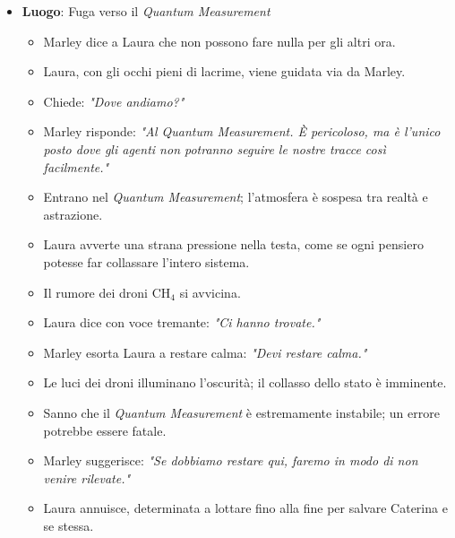 \begin{itemize}
    \item \textbf{Luogo}: Fuga verso il \emph{Quantum Measurement}
    \begin{itemize}
        \item Marley dice a Laura che non possono fare nulla per gli altri ora.
        \item Laura, con gli occhi pieni di lacrime, viene guidata via da Marley.
        \item Chiede: \emph{"Dove andiamo?"}
        \item Marley risponde: \emph{"Al Quantum Measurement. È pericoloso, ma è l'unico posto dove gli agenti non potranno seguire le nostre tracce così facilmente."}
        \item Entrano nel \emph{Quantum Measurement}; l'atmosfera è sospesa tra realtà e astrazione.
        \item Laura avverte una strana pressione nella testa, come se ogni pensiero potesse far collassare l'intero sistema.
    \end{itemize}
    
    \begin{itemize}
        \item Il rumore dei droni CH$_4$ si avvicina.
        \item Laura dice con voce tremante: \emph{"Ci hanno trovate."}
        \item Marley esorta Laura a restare calma: \emph{"Devi restare calma."}
        \item Le luci dei droni illuminano l'oscurità; il collasso dello stato è imminente.
        \item Sanno che il \emph{Quantum Measurement} è estremamente instabile; un errore potrebbe essere fatale.
        \item Marley suggerisce: \emph{"Se dobbiamo restare qui, faremo in modo di non venire rilevate."}
        \item Laura annuisce, determinata a lottare fino alla fine per salvare Caterina e se stessa.
    \end{itemize}
\end{itemize}
